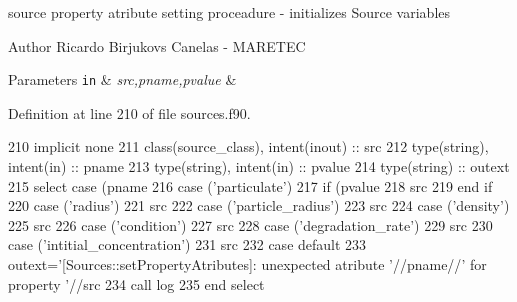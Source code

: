 source property atribute setting proceadure -\/ initializes Source variables 

\begin{DoxyAuthor}{Author}
Ricardo Birjukovs Canelas -\/ M\+A\+R\+E\+T\+EC 
\end{DoxyAuthor}

\begin{DoxyParams}[1]{Parameters}
\mbox{\tt in}  & {\em src,pname,pvalue} & \\
\hline
\end{DoxyParams}


Definition at line 210 of file sources.\+f90.


\begin{DoxyCode}
210     \textcolor{keywordtype}{implicit none}
211     \textcolor{keywordtype}{class}(source\_class), \textcolor{keywordtype}{intent(inout)} :: src
212     \textcolor{keywordtype}{type}(string), \textcolor{keywordtype}{intent(in)} :: pname
213     \textcolor{keywordtype}{type}(string), \textcolor{keywordtype}{intent(in)} :: pvalue
214     \textcolor{keywordtype}{type}(string) :: outext
215     \textcolor{keywordflow}{select case} (pname%
216     \textcolor{keywordflow}{case} (\textcolor{stringliteral}{'particulate'})
217         \textcolor{keywordflow}{if} (pvalue%
218             src%
219 \textcolor{keywordflow}{        end if}
220     \textcolor{keywordflow}{case} (\textcolor{stringliteral}{'radius'})
221         src%
222     \textcolor{keywordflow}{case} (\textcolor{stringliteral}{'particle\_radius'})
223         src%
224     \textcolor{keywordflow}{case} (\textcolor{stringliteral}{'density'})
225         src%
226     \textcolor{keywordflow}{case} (\textcolor{stringliteral}{'condition'})
227         src%
228     \textcolor{keywordflow}{case} (\textcolor{stringliteral}{'degradation\_rate'})
229         src%
230     \textcolor{keywordflow}{case} (\textcolor{stringliteral}{'intitial\_concentration'})
231         src%
232 \textcolor{keywordflow}{        case default}
233         outext=\textcolor{stringliteral}{'[Sources::setPropertyAtributes]: unexpected atribute '}//pname//\textcolor{stringliteral}{' for property '}//src%
234         \textcolor{keyword}{call }log%
235 \textcolor{keywordflow}{    end select}
\end{DoxyCode}
\mbox{\label{namespacesources__mod_aa76f16f8ee96bc86b553aa54d420321c}} 
